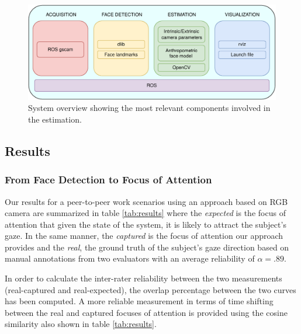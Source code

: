 \documentclass{sig-alternate}
\begin{document}
\begin{figure}[h!]
    \centering
    \includegraphics[width=0.9\columnwidth]{system}
    \caption{\small System overview showing the most relevant components involved in the estimation.}
    \label{system}
\end{figure}



\subsection{Results}

\subsubsection{From Face Detection to Focus of Attention} \label{fromFaceTo}


Our results for a peer-to-peer work scenarios using an approach based on RGB
camera are summarized in table \ref{tab:results} where the \textit{expected} is
the focus of attention that given the state of the system, it is likely to
attract the subject's gaze. In the same manner, the \textit{captured} is the
focus of attention our approach provides and the \textit{real}, the ground truth
of the subject's gaze direction based on manual annotations from two evaluators
with an average reliability of $ \alpha = .89 $.

In order to calculate the inter-rater reliability between the two measurements
(real-captured and real-expected), the overlap percentage between the two curves
has been computed. A more reliable measurement in terms of time shifting between
the real and captured focuses of attention is provided using the cosine
similarity also shown in table \ref{tab:results}. 
\end{document}
